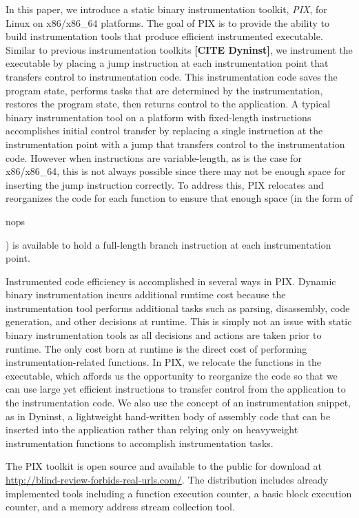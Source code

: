 In this paper, we introduce a static binary instrumentation toolkit, \textit{PIX}, for Linux on
x86/x86\_64 platforms. The goal of PIX is to provide the ability
to build instrumentation tools that produce efficient instrumented
executable. Similar to previous instrumentation toolkits \textbf{[CITE Dyninst]}, we instrument the executable 
by placing a jump instruction at each instrumentation
point that transfers control to instrumentation code. This instrumentation code saves the
program state, performs tasks that are determined by the instrumentation,
restores the program state, then returns control to the application.
A typical binary instrumentation tool on a platform with fixed-length instructions 
\cite{tikir2006pmac} accomplishes initial control transfer by replacing a
single instruction at the instrumentation point with a jump that transfers
control to the instrumentation code. However when instructions are variable-length, as
is the case for x86/x86\_64, this is not always possible since there may not be enough space for 
inserting the jump instruction correctly. To address this, PIX
relocates and reorganizes the code for each function to ensure that enough
space (in the form of \begin{it}nops\end{it}) is available to hold a full-length branch instruction at each
instrumentation point.

Instrumented code efficiency is accomplished in several ways in PIX. Dynamic binary instrumentation
incurs additional runtime cost because the instrumentation tool performs additional tasks such 
as parsing, disassembly, code generation, and other decisions at runtime. This
 is simply not an issue with static binary instrumentation tools as all
decisions and actions are taken prior to runtime. The only cost born at runtime is the direct
cost of performing instrumentation-related functions. In PIX, we relocate the 
functions in the executable, which affords us the opportunity to reorganize the code so that we
can use large yet efficient instructions to transfer control from the
application to the instrumentation code. We also use the concept of an
instrumentation snippet, as in Dyninst, a lightweight hand-written body of assembly code that can
be inserted into the application rather than relying only on heavyweight
instrumentation functions to accomplish instrumentation tasks.

The PIX toolkit is open source and available to the public for download 
at \url{http://blind-review-forbids-real-urls.com/}. The distribution includes already implemented tools 
including a function execution counter, a basic block
execution counter, and a memory address stream collection tool.

